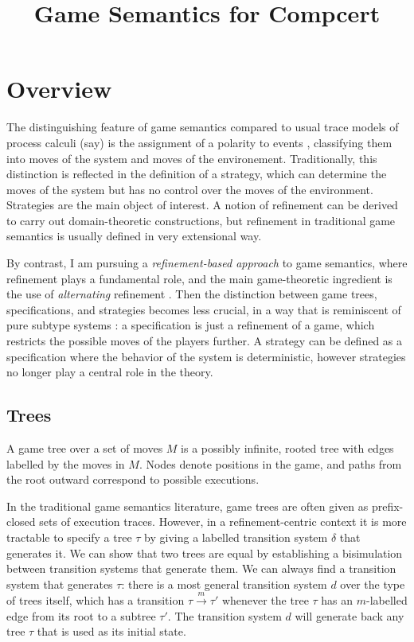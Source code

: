 \documentclass[11pt]{article}
\title{Game Semantics for Compcert}
\begin{document}
\maketitle

\section{Overview}

The distinguishing feature of game semantics
compared to usual trace models of process calculi (say)
is the assignment of a polarity to events \cite{cspgs},
classifying them into moves of the system
and moves of the environement.
Traditionally,
this distinction is reflected in the definition of a strategy,
which can determine the moves of the system
but has no control over the moves of the environment.
Strategies are the main object of interest.
A notion of refinement can be derived
to carry out domain-theoretic constructions,
but refinement in traditional game semantics
is usually defined in very extensional way.

By contrast,
I am pursuing a \emph{refinement-based approach} to game semantics,
where refinement plays a fundamental role,
and the main game-theoretic ingredient is the use of
\emph{alternating} refinement \cite{altref}.
Then
the distinction between game trees, specifications, and strategies
becomes less crucial,
in a way that is reminiscent of pure subtype systems \cite{pts}:
a specification is just a refinement of a game,
which restricts the possible moves of the players further.
A strategy can be defined as
a specification where the behavior of the system is deterministic,
however strategies no longer play a central role in the theory.

\subsection{Trees}

A game tree over a set of moves $M$
is a possibly infinite, rooted tree
with edges labelled by the moves in $M$.
Nodes denote positions in the game, and
paths from the root outward correspond to
possible executions.

In the traditional game semantics literature,
game trees are often given as prefix-closed sets of
execution traces.
However, in a refinement-centric context it is more tractable
to specify a tree $\tau$ by giving
a labelled transition system $\delta$ that generates it.
We can show that two trees are equal by
establishing a bisimulation between transition systems that generate them.
We can always find a transition system that generates $\tau$:
there is a most general transition system $d$
over the type of trees itself,
which has a transition
$\tau \stackrel{m}{\longrightarrow} \tau'$
whenever the tree $\tau$ has an $m$-labelled edge
from its root to a subtree $\tau'$.
The transition system $d$ will generate back any
tree $\tau$ that is used as its initial state.
\end{document}
